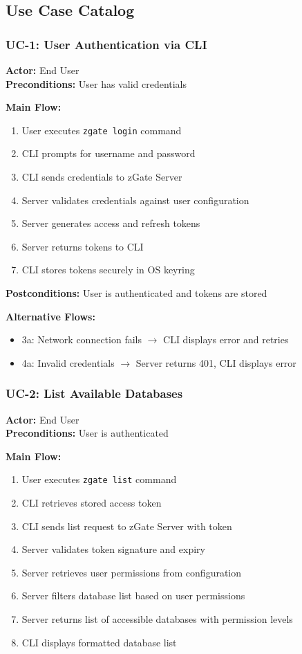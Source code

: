 \subsection{Use Case Catalog}

\subsubsection{UC-1: User Authentication via CLI}
\textbf{Actor:} End User \\
\textbf{Preconditions:} User has valid credentials

\textbf{Main Flow:}
\begin{enumerate}
    \item User executes \texttt{zgate login} command
    \item CLI prompts for username and password
    \item CLI sends credentials to zGate Server
    \item Server validates credentials against user configuration
    \item Server generates access and refresh tokens
    \item Server returns tokens to CLI
    \item CLI stores tokens securely in OS keyring
\end{enumerate}

\textbf{Postconditions:} User is authenticated and tokens are stored

\textbf{Alternative Flows:}
\begin{itemize}
    \item 3a: Network connection fails $\rightarrow$ CLI displays error and retries
    \item 4a: Invalid credentials $\rightarrow$ Server returns 401, CLI displays error
\end{itemize}

\subsubsection{UC-2: List Available Databases}
\textbf{Actor:} End User \\
\textbf{Preconditions:} User is authenticated

\textbf{Main Flow:}
\begin{enumerate}
    \item User executes \texttt{zgate list} command
    \item CLI retrieves stored access token
    \item CLI sends list request to zGate Server with token
    \item Server validates token signature and expiry
    \item Server retrieves user permissions from configuration
    \item Server filters database list based on user permissions
    \item Server returns list of accessible databases with permission levels
    \item CLI displays formatted database list
\end{enumerate}

